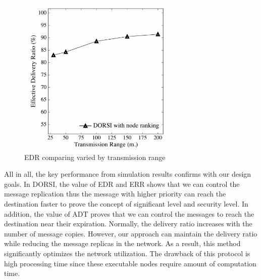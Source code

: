\begin{figure}[!h]
\centering
\includegraphics[width=3in]{Graphs/EDRcomparingvariedbytransmissionrange.pdf}
\caption{EDR comparing varied by transmission range}
\label{Fig:DORSI:EDR comparing varied by transmission range}
\end{figure}

All in all, the key performance from simulation results confirms with our design goals. 
In DORSI, the value of EDR and ERR shows that we can control the message replication thus the message with higher priority can reach the destination faster to prove the concept of significant level and security level. 
In addition, the value of ADT proves that we can control the messages to reach the destination near their expiration. 
Normally, the delivery ratio increases with the number of message copies.
However, our approach can maintain the delivery ratio while reducing the message replicas in the network. 
As a result, this method significantly optimizes the network utilization. 
The drawback of this protocol is high processing time since these executable nodes require amount of computation time.

